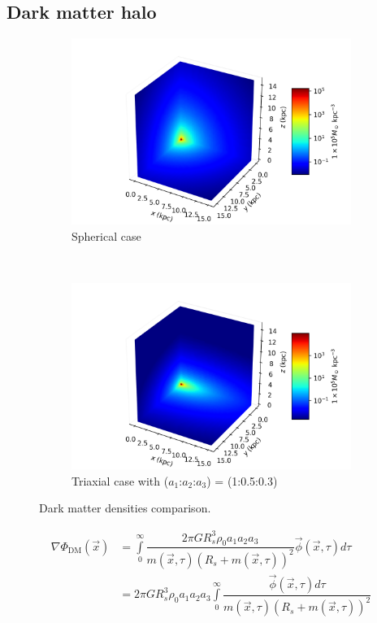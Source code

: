 	\subsection{Dark matter halo}
	\begin{figure}[h]
		\centering
		\begin{subfigure}[b]{0.49\textwidth}
			\includegraphics[width = \textwidth]{"../Files/Week 7/symmetric"}
			\caption{Spherical case}
			\label{fig: symmetricDensity3d}
		\end{subfigure}
		~ 
		\begin{subfigure}[b]{0.49\textwidth}
			\includegraphics[width=\textwidth]{"../Files/Week 7/triaxial"}
			\caption{Triaxial case with ($a_1$:$a_2$:$a_3$) = (1:0.5:0.3)}
			\label{fig: triaxialDensity3d}
		\end{subfigure}
		\caption{Dark matter densities comparison.}
		\label{fig: symmetricTriaxial}
	\end{figure}
	\begin{equation}
		\begin{array}{rl}
			\nabla \Phi_\text{DM}(\vec{x}) & = 
			\displaystyle\int\limits_{0}^{\infty}
			\dfrac{2 \pi G R_{s}^{3}\rho_0 a_{1} a_{2} a_{3}}{m(\vec{x}, \tau)\left(R_{s} + m(\vec{x}, \tau)\right)^{2}}
			\vec{\phi}(\vec{x}, \tau) d\tau \\
			& = 2 \pi G R_{s}^{3}\rho_0 a_{1} a_{2} a_{3} \displaystyle\int\limits_{0}^{\infty}
			\dfrac{\vec{\phi}(\vec{x}, \tau) d\tau}{m(\vec{x}, \tau)\left(R_{s} + m(\vec{x}, \tau)\right)^{2}}	
		\end{array}
	\end{equation}
	
